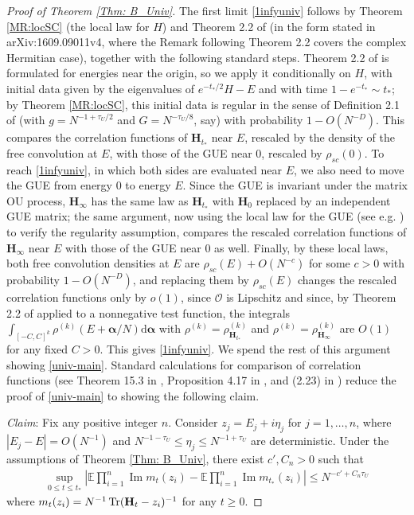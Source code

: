 \begin{proof}[Proof of Theorem \ref{Thm: B_Univ}]
The first limit \eqref{1infyuniv} follows by Theorem \ref{MR:locSC} (the local law for $H$) and Theorem 2.2 of \cite{LANDON20191137} (in the form stated in arXiv:1609.09011v4, where the Remark following Theorem 2.2 covers the complex Hermitian case), together with the following standard steps. Theorem 2.2 of \cite{LANDON20191137} is formulated for energies near the origin, so we apply it conditionally on $H$, with initial data given by the eigenvalues of $e^{-t_{*}/2}H-E$ and with time $1-e^{-t_{*}}\sim t_{*}$; by Theorem \ref{MR:locSC}, this initial data is regular in the sense of Definition 2.1 of \cite{LANDON20191137} (with $g=N^{-1+\tau_{U}/2}$ and $G=N^{-\tau_{U}/8}$, say) with probability $1-O(N^{-D})$. This compares the correlation functions of $\mathbf{H}_{t_{*}}$ near $E$, rescaled by the density of the free convolution at $E$, with those of the GUE near $0$, rescaled by $\rho_{sc}(0)$. To reach \eqref{1infyuniv}, in which both sides are evaluated near $E$, we also need to move the GUE from energy $0$ to energy $E$. Since the GUE is invariant under the matrix OU process, $\mathbf{H}_{\infty}$ has the same law as $\mathbf{H}_{t_{*}}$ with $\mathbf{H}_{0}$ replaced by an independent GUE matrix; the same argument, now using the local law for the GUE (see e.g. \cite{erdHos2012rigidity}) to verify the regularity assumption, compares the rescaled correlation functions of $\mathbf{H}_{\infty}$ near $E$ with those of the GUE near $0$ as well. Finally, by these local laws, both free convolution densities at $E$ are $\rho_{sc}(E)+O(N^{-c})$ for some $c>0$ with probability $1-O(N^{-D})$, and replacing them by $\rho_{sc}(E)$ changes the rescaled correlation functions only by $o(1)$, since $\mathcal{O}$ is Lipschitz and since, by Theorem 2.2 of \cite{LANDON20191137} applied to a nonnegative test function, the integrals $\int_{[-C,C]^{k}}\rho^{(k)}(E+\boldsymbol{\alpha}/N)\mathrm{d}\boldsymbol{\alpha}$ with $\rho^{(k)}=\rho^{(k)}_{\mathbf{H}_{t_{*}}}$ and $\rho^{(k)}=\rho^{(k)}_{\mathbf{H}_{\infty}}$ are $O(1)$ for any fixed $C>0$. This gives \eqref{1infyuniv}. We spend the rest of this argument showing \eqref{univ-main}. Standard calculations for comparison of correlation functions (see Theorem 15.3 in \cite{erdHos2017dynamical}, Proposition 4.17 in \cite{Xu:2024aa}, and (2.23) in \cite{YY_25}) reduce the proof of \eqref{univ-main} to showing the following claim.

\bigskip

\noindent \emph{Claim}: Fix any positive integer $n$. Consider $z_{j}=E_{j}+i\eta_{j}$ for $j=1,\ldots,n$, where $|E_{j}-E|=O(N^{-1})$ and $N^{-1-\tau_{U}}\leq \eta_{j}\leq N^{-1+\tau_{U}}$ are deterministic. Under the assumptions of Theorem \ref{Thm: B_Univ}, there exist $c',C_{n}>0$ such that
%
\begin{align}\label{417}
\sup _{0 \leq t \leq t_*}\left|\mathbb{E} \prod_{i=1}^n \operatorname{Im} m_t(z_i)-\mathbb{E} \prod_{i=1}^n \operatorname{Im} m_{t_*}(z_i)\right| \leq N^{-c'+C_n\tau_{U}}
\end{align}
%
where $m_{t}(z_{i})=N^{-1}\operatorname{Tr}({\mathbf{H}}_{t}-z_{i})^{-1}$ for any $t\geq0$. 


\end{proof}
